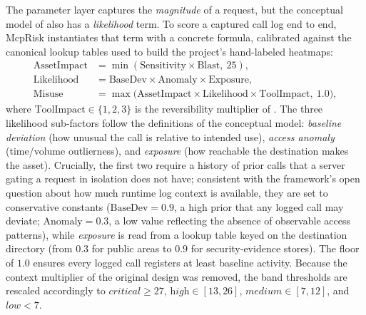 The parameter layer captures the \emph{magnitude} of a request, but the
conceptual model of  also has a \emph{likelihood} term. To
score a captured call log end to end, McpRisk instantiates that term with a
concrete formula, calibrated against the canonical lookup tables used to build
the project's hand-labeled heatmaps:
\begin{align}
\text{AssetImpact} &= \min(\text{Sensitivity}\times\text{Blast},\ 25),
\label{eq:assetimpact}\\
\text{Likelihood}  &= \text{BaseDev}\times\text{Anomaly}\times\text{Exposure},
\label{eq:likelihood}\\
\text{Misuse}      &= \max\!\big(\text{AssetImpact}\times\text{Likelihood}
                       \times\text{ToolImpact},\ 1.0\big),
\label{eq:misuse}
\end{align}
where $\text{ToolImpact}\in\{1,2,3\}$ is the reversibility multiplier of
. The three likelihood sub-factors follow the
definitions of the conceptual model: \emph{baseline deviation} (how unusual the
call is relative to intended use), \emph{access anomaly} (time/volume
outlierness), and \emph{exposure} (how reachable the destination makes the
asset). Crucially, the first two require a history of prior calls that a server
gating a request in isolation does not have; consistent with the framework's
open question about how much runtime log context is available, they are set to
conservative constants ($\text{BaseDev}=0.9$, a high prior that any logged call
may deviate; $\text{Anomaly}=0.3$, a low value reflecting the absence of
observable access patterns), while \emph{exposure} is read from a lookup table
keyed on the destination directory (from $0.3$ for public areas to $0.9$ for
security-evidence stores). The floor of $1.0$ ensures every logged call registers
at least baseline activity. Because the context multiplier of the original
design was removed, the band thresholds are rescaled accordingly to
$\textit{critical}\ge 27$, $\textit{high}\in[13,26]$, $\textit{medium}\in[7,12]$,
and $\textit{low}<7$.

